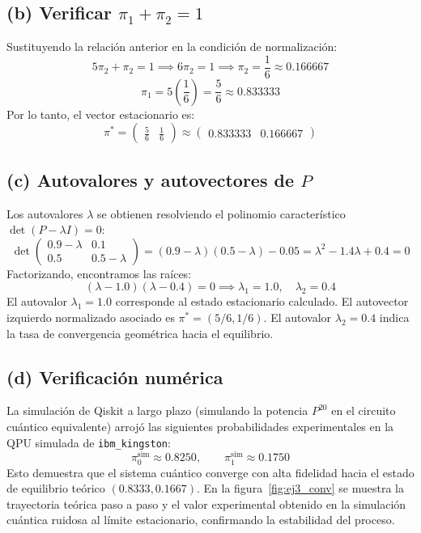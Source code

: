 \documentclass[12pt,a4paper]{article}
\begin{document}
\subsection{(b) Verificar \(\pi_1 + \pi_2 = 1\)}
Sustituyendo la relación anterior en la condición de normalización:
\[
5\pi_2 + \pi_2 = 1 \implies 6\pi_2 = 1 \implies \pi_2 = \frac{1}{6} \approx 0.166667
\]
\[
\pi_1 = 5 \left(\frac{1}{6}\right) = \frac{5}{6} \approx 0.833333
\]
Por lo tanto, el vector estacionario es:
\[
\pi^* = \begin{pmatrix} \frac{5}{6} & \frac{1}{6} \end{pmatrix} \approx \begin{pmatrix} 0.833333 & 0.166667 \end{pmatrix}
\]

\subsection{(c) Autovalores y autovectores de \(P\)}
Los autovalores \(\lambda\) se obtienen resolviendo el polinomio característico \(\det(P - \lambda I) = 0\):
\[
\det \begin{pmatrix}
0.9-\lambda & 0.1\\
0.5 & 0.5-\lambda
\end{pmatrix}
= (0.9-\lambda)(0.5-\lambda) - 0.05 = \lambda^2 - 1.4\lambda + 0.4 = 0
\]
Factorizando, encontramos las raíces:
\[
(\lambda - 1.0)(\lambda - 0.4) = 0 \implies \lambda_1 = 1.0, \quad \lambda_2 = 0.4
\]
El autovalor \(\lambda_1 = 1.0\) corresponde al estado estacionario calculado. El autovector izquierdo normalizado asociado es \(\pi^* = (5/6, 1/6)\). El autovalor \(\lambda_2 = 0.4\) indica la tasa de convergencia geométrica hacia el equilibrio.

\subsection{(d) Verificación numérica}
La simulación de Qiskit a largo plazo (simulando la potencia \(P^{20}\) en el circuito cuántico equivalente) arrojó las siguientes probabilidades experimentales en la QPU simulada de \texttt{ibm\_kingston}:
\[
\pi_0^{\text{sim}} \approx 0.8250, \qquad \pi_1^{\text{sim}} \approx 0.1750
\]
Esto demuestra que el sistema cuántico converge con alta fidelidad hacia el estado de equilibrio teórico \((0.8333, 0.1667)\). En la figura~\ref{fig:ej3_conv} se muestra la trayectoria teórica paso a paso y el valor experimental obtenido en la simulación cuántica ruidosa al límite estacionario, confirmando la estabilidad del proceso.
\end{document}
